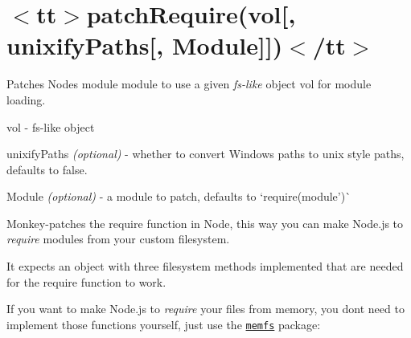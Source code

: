 \chapter{\texorpdfstring{$<$}{<}tt\texorpdfstring{$>$}{>}patch\+Require(vol\mbox{[}, unixify\+Paths\mbox{[}, Module\mbox{]}\mbox{]})\texorpdfstring{$<$}{<}/tt\texorpdfstring{$>$}{>}}
\hypertarget{md__d_1_2_g_i_t_2_food_link_2foodlink_8client_2node__modules_2fs-monkey_2docs_2api_2patch_require}{}\label{md__d_1_2_g_i_t_2_food_link_2foodlink_8client_2node__modules_2fs-monkey_2docs_2api_2patch_require}
\label{md__d_1_2_g_i_t_2_food_link_2foodlink_8client_2node__modules_2fs-monkey_2docs_2api_2patch_require_autotoc_md8326}%
%


Patches Node\textquotesingle{}s {\ttfamily module} module to use a given {\itshape fs-\/like} object {\ttfamily vol} for module loading.


\begin{DoxyItemize}
\item {\ttfamily vol} -\/ fs-\/like object
\item {\ttfamily unixify\+Paths} {\itshape (optional)} -\/ whether to convert Windows paths to unix style paths, defaults to {\ttfamily false}.
\item {\ttfamily Module} {\itshape (optional)} -\/ a module to patch, defaults to `require(\textquotesingle{}module')\`{}
\end{DoxyItemize}

Monkey-\/patches the {\ttfamily require} function in Node, this way you can make Node.\+js to {\itshape require} modules from your custom filesystem.

It expects an object with three filesystem methods implemented that are needed for the {\ttfamily require} function to work.


\begin{DoxyCode}{0}
\DoxyCodeLine{\};}

\end{DoxyCode}


If you want to make Node.\+js to {\itshape require} your files from memory, you don\textquotesingle{}t need to implement those functions yourself, just use the \href{https://github.com/streamich/memfs}{\texttt{ {\ttfamily memfs}}} package\+:


